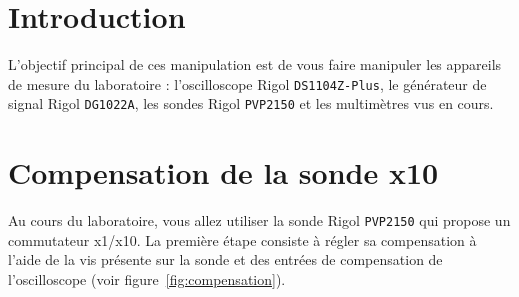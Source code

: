 \documentclass{../template/labo}
\author{The Fantastic Four}
\begin{document}

\section{Introduction}
L'objectif principal de ces manipulation est de vous faire manipuler les appareils de mesure du laboratoire : l'oscilloscope Rigol \texttt{DS1104Z-Plus}, le générateur de signal Rigol \texttt{DG1022A}, les sondes Rigol \texttt{PVP2150} et les multimètres vus en cours.





\section{Compensation de la sonde x10}
Au cours du laboratoire, vous allez utiliser la sonde Rigol \texttt{PVP2150} qui propose un commutateur x1/x10.
La première étape consiste à régler sa compensation à l'aide de la vis présente sur la sonde et des entrées de compensation de l'oscilloscope (voir figure~\ref{fig:compensation}).
\end{document}
